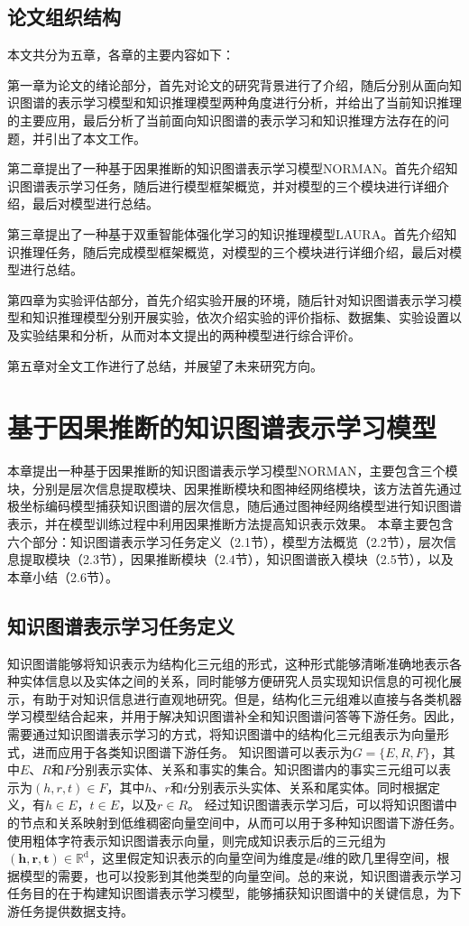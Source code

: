 \documentclass[algorithmlist, AutoFakeBold, AutoFakeSlant, figurelist, tablelist, nomlist, masters]{seuthesix}
\begin{document}
\section{论文组织结构}
本文共分为五章，各章的主要内容如下：

第一章为论文的绪论部分，首先对论文的研究背景进行了介绍，随后分别从面向知识图谱的表示学习模型和知识推理模型两种角度进行分析，并给出了当前知识推理的主要应用，最后分析了当前面向知识图谱的表示学习和知识推理方法存在的问题，并引出了本文工作。

第二章提出了一种基于因果推断的知识图谱表示学习模型NORMAN。首先介绍知识图谱表示学习任务，随后进行模型框架概览，并对模型的三个模块进行详细介绍，最后对模型进行总结。

第三章提出了一种基于双重智能体强化学习的知识推理模型LAURA。首先介绍知识推理任务，随后完成模型框架概览，对模型的三个模块进行详细介绍，最后对模型进行总结。

第四章为实验评估部分，首先介绍实验开展的环境，随后针对知识图谱表示学习模型和知识推理模型分别开展实验，依次介绍实验的评价指标、数据集、实验设置以及实验结果和分析，从而对本文提出的两种模型进行综合评价。

第五章对全文工作进行了总结，并展望了未来研究方向。


\chapter{基于因果推断的知识图谱表示学习模型}
本章提出一种基于因果推断的知识图谱表示学习模型NORMAN，主要包含三个模块，分别是层次信息提取模块、因果推断模块和图神经网络模块，该方法首先通过极坐标编码模型捕获知识图谱的层次信息，随后通过图神经网络模型进行知识图谱表示，并在模型训练过程中利用因果推断方法提高知识表示效果。
本章主要包含六个部分：知识图谱表示学习任务定义（2.1节），模型方法概览（2.2节），层次信息提取模块（2.3节），因果推断模块（2.4节），知识图谱嵌入模块（2.5节），以及本章小结（2.6节）。

\section{知识图谱表示学习任务定义}
知识图谱能够将知识表示为结构化三元组的形式，这种形式能够清晰准确地表示各种实体信息以及实体之间的关系，同时能够方便研究人员实现知识信息的可视化展示，有助于对知识信息进行直观地研究。但是，结构化三元组难以直接与各类机器学习模型结合起来，并用于解决知识图谱补全和知识图谱问答等下游任务。因此，需要通过知识图谱表示学习的方式，将知识图谱中的结构化三元组表示为向量形式，进而应用于各类知识图谱下游任务。
知识图谱可以表示为$G=\{E, R, F\}$，其中$E$、$R$和$F$分别表示实体、关系和事实的集合。知识图谱内的事实三元组可以表示为$(h, r, t) \in F$，其中$h$、$r$和$t$分别表示头实体、关系和尾实体。同时根据定义，有$h \in E$，$t \in E$，以及$r \in R$。
经过知识图谱表示学习后，可以将知识图谱中的节点和关系映射到低维稠密向量空间中，从而可以用于多种知识图谱下游任务。使用粗体字符表示知识图谱表示向量，则完成知识表示后的三元组为$\left(\bm{h}, \bm{r}, \bm{t}\right) \in \mathbb{R}^{\mathrm{d}}$，这里假定知识表示的向量空间为维度是$d$维的欧几里得空间，根据模型的需要，也可以投影到其他类型的向量空间。总的来说，知识图谱表示学习任务目的在于构建知识图谱表示学习模型，能够捕获知识图谱中的关键信息，为下游任务提供数据支持。
\end{document}
